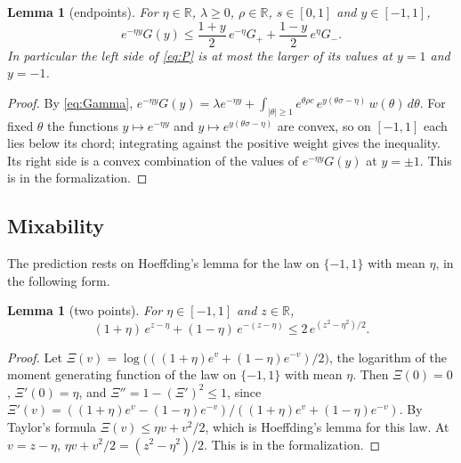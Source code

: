 \documentclass[12pt]{amsart}
\newtheorem{lemma}[theorem]{Lemma}
\theoremstyle{definition}
\numberwithin{equation}{section}
\newcommand{\R}{\mathbb{R}}
\newcommand{\leanmap}[1]{\ignorespaces}
\newcommand{\mapnote}[1]{\ignorespaces}
\begin{document}
\begin{lemma}[endpoints]\label{lem:endpoints}
\leanmap{RegretKappa.Upper.G_convex, RegretKappa.Upper.exp_mul_le}
\mapnote{Lean proves the inequality for $\Gamma/2$ in place of $\Gamma$ and for every $\rho c$ and $\sigma$ in $\R$, and for the term $\lambda e^{-\eta y}$ separately.}
For $\eta\in\R$, $\lambda\ge0$, $\rho\in\R$, $s\in[0,1]$ and $y\in[-1,1]$,
\[
e^{-\eta y}G(y)\le\frac{1+y}2\,e^{-\eta}G_++\frac{1-y}2\,e^{\eta}G_- .
\]
In particular the left side of \eqref{eq:P} is at most the larger of its values at $y=1$ and $y=-1$.
\end{lemma}

\begin{proof}
By \eqref{eq:Gamma}, $e^{-\eta y}G(y)=\lambda e^{-\eta y}+\int_{|\theta|\ge1}e^{\theta\rho c}\,e^{y(\theta\sigma-\eta)}\,w(\theta)\,d\theta$. For fixed $\theta$ the functions $y\mapsto e^{-\eta y}$ and $y\mapsto e^{y(\theta\sigma-\eta)}$ are convex, so on $[-1,1]$ each lies below its chord; integrating against the positive weight gives the inequality. Its right side is a convex combination of the values of $e^{-\eta y}G(y)$ at $y=\pm1$. This is  in the formalization.
\end{proof}

\subsection{Mixability}\label{subsec:mix}
The prediction rests on Hoeffding's lemma for the law on $\{-1,1\}$ with mean $\eta$, in the following form.

\begin{lemma}[two points]\label{lem:mix}
\leanmap{RegretKappa.Upper.two_point, RegretKappa.Upper.two_point_mgf}
\mapnote{Lean derives it from Hoeffding's lemma in Mathlib, applied to the law on two points of \lname{RegretKappa.Upper.two_point_mgf}.}
For $\eta\in[-1,1]$ and $z\in\R$,
\[
(1+\eta)\,e^{z-\eta}+(1-\eta)\,e^{-(z-\eta)}\le2\,e^{(z^2-\eta^2)/2}.
\]
\end{lemma}

\begin{proof}
Let $\Xi(v)=\log\bigl(((1+\eta)e^v+(1-\eta)e^{-v})/2\bigr)$, the logarithm of the moment generating function of the law on $\{-1,1\}$ with mean $\eta$. Then $\Xi(0)=0$, $\Xi'(0)=\eta$, and $\Xi''=1-(\Xi')^2\le1$, since $\Xi'(v)=((1+\eta)e^v-(1-\eta)e^{-v})/((1+\eta)e^v+(1-\eta)e^{-v})$. By Taylor's formula $\Xi(v)\le\eta v+v^2/2$, which is Hoeffding's lemma for this law. At $v=z-\eta$, $\eta v+v^2/2=(z^2-\eta^2)/2$. This is  in the formalization.
\end{proof}
\end{document}
